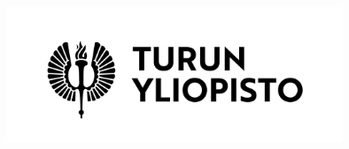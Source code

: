 
\usepackage{geometry}




\theoremstyle{plain}
\newtheorem{theorem}{Lause}
\newtheorem{lemma}{Lemma}
\newtheorem{corollary}{Seuraus}
%
\theoremstyle{definition}
\newtheorem{definition}{M\"a\"aritelm\"a}
\newtheorem{example}{Esimerkki}
%
\theoremstyle{remark}
\newtheorem{remark}{Huomautus}


\newcommand{\tekija}{{Noora Angelva}} %
\newcommand{\titteli}{{ }} %
\newcommand{\otsikko}{{Headline}}   %
\newcommand{\tutkielma}{{Thesis}}   %
\newcommand{\aika}{{Kesäkuu 2021}}   %
\newcommand{\paaaine}{{Information and Communication Technology}} %
\newcommand{\ohjaaja}{{Prof. H. H.}} %
\newcommand{\tarkastaja}{{Dos. D.D. }} %



\pagestyle{empty}  %

\begin{center}
\includegraphics[width=10cm]{UTU_logo_FI} %
\end{center}

